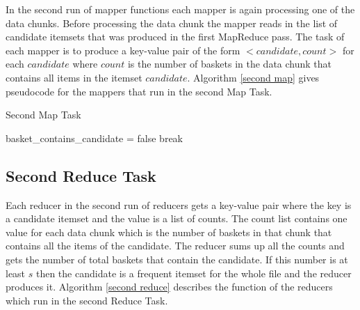 In the second run of mapper functions each mapper is again processing one of the data chunks. Before processing the data chunk the mapper reads in the list of candidate itemsets that was produced in the first MapReduce pass. The task of each mapper is to produce a key-value pair of the form $<candidate, count>$ for each $candidate$ where $count$ is the number of baskets in the data chunk that contains all items in the itemset $candidate$. Algorithm \ref{second map} gives pseudocode for the mappers that run in the second Map Task.
\begin{algorithm}
  \caption{Second Map Task}\label{second map}
  \begin{algorithmic}[1]
            		\State basket\_contains\_candidate = false
            		\State break
            	\EndIf
            \EndFor
            \EndIf
            \EndFor
       \EndFor
       
        \EndFor
      
    \EndFunction
\end{algorithmic}
\end{algorithm}

\subsection{Second Reduce Task}
Each reducer in the second run of reducers gets a key-value pair where the key is a candidate itemset and the value is a list of counts. The count list contains one value for each data chunk which is the number of baskets in that chunk that contains all the items of the candidate. The reducer sums up all the counts and gets the number of total baskets that contain the candidate. If this number is at least $s$ then the candidate is a frequent itemset for the whole file and the reducer produces it. Algorithm \ref{second reduce} describes the function of the reducers which run in the second Reduce Task.

